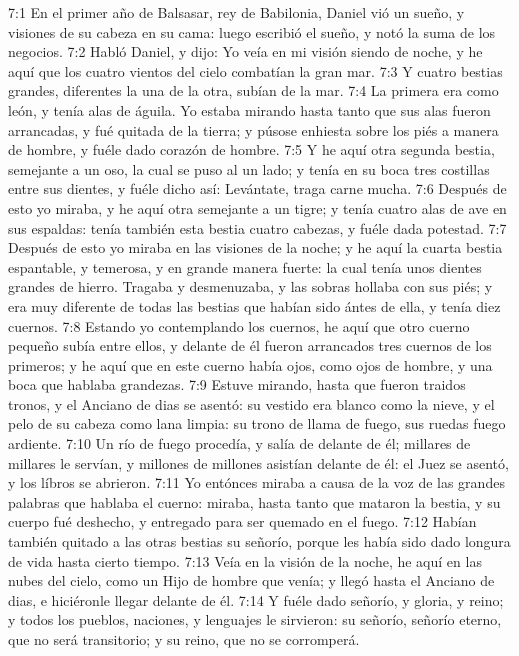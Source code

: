 7:1 En el primer año de Balsasar, rey de Babilonia, Daniel vió un sueño, y visiones de su cabeza en su cama: luego escribió el sueño, y notó la suma de los negocios.
7:2 Habló Daniel, y dijo: Yo veía en mi visión siendo de noche, y he aquí que los cuatro vientos del cielo combatían la gran mar.
7:3 Y cuatro bestias grandes, diferentes la una de la otra, subían de la mar.
7:4 La primera era como león, y tenía alas de águila. Yo estaba mirando hasta tanto que sus alas fueron arrancadas, y fué quitada de la tierra; y púsose enhiesta sobre los piés a manera de hombre, y fuéle dado corazón de hombre.
7:5 Y he aquí otra segunda bestia, semejante a un oso, la cual se puso al un lado; y tenía en su boca tres costillas entre sus dientes, y fuéle dicho así: Levántate, traga carne mucha.
7:6 Después de esto yo miraba, y he aquí otra semejante a un tigre; y tenía cuatro alas de ave en sus espaldas: tenía también esta bestia cuatro cabezas, y fuéle dada potestad.
7:7 Después de esto yo miraba en las visiones de la noche; y he aquí la cuarta bestia espantable, y temerosa, y en grande manera fuerte: la cual tenía unos dientes grandes de hierro. Tragaba y desmenuzaba, y las sobras hollaba con sus piés; y era muy diferente de todas las bestias que habían sido ántes de ella, y tenía diez cuernos.
7:8 Estando yo contemplando los cuernos, he aquí que otro cuerno pequeño subía entre ellos, y delante de él fueron arrancados tres cuernos de los primeros; y he aquí que en este cuerno había ojos, como ojos de hombre, y una boca que hablaba grandezas.
7:9 Estuve mirando, hasta que fueron traidos tronos, y el Anciano de dias se asentó: su vestido era blanco como la nieve, y el pelo de su cabeza como lana limpia: su trono de llama de fuego, sus ruedas fuego ardiente.
7:10 Un río de fuego procedía, y salía de delante de él; millares de millares le servían, y millones de millones asistían delante de él: el Juez se asentó, y los líbros se abrieron.
7:11 Yo entónces miraba a causa de la voz de las grandes palabras que hablaba el cuerno: miraba, hasta tanto que mataron la bestia, y su cuerpo fué deshecho, y entregado para ser quemado en el fuego.
7:12 Habían también quitado a las otras bestias su señorío, porque les había sido dado longura de vida hasta cierto tiempo.
7:13 Veía en la visión de la noche, he aquí en las nubes del cielo, como un Hijo de hombre que venía; y llegó hasta el Anciano de dias, e hiciéronle llegar delante de él.
7:14 Y fuéle dado señorío, y gloria, y reino; y todos los pueblos, naciones, y lenguajes le sirvieron: su señorío, señorío eterno, que no será transitorio; y su reino, que no se corromperá.

